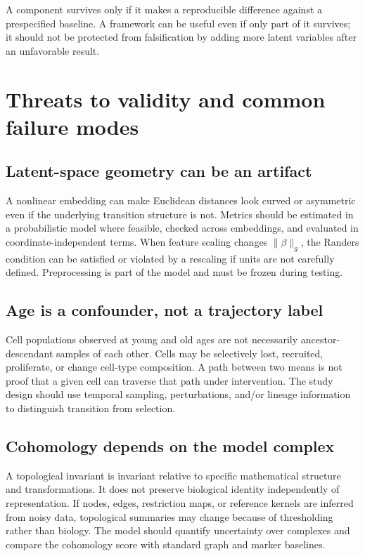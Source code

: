 \documentclass[11pt,a4paper]{article}
\theoremstyle{definition}
\theoremstyle{remark}
\begin{document}
A component survives only if it makes a reproducible difference against a prespecified baseline. A framework can be useful even if only part of it survives; it should not be protected from falsification by adding more latent variables after an unfavorable result.

\section{Threats to validity and common failure modes}
\subsection{Latent-space geometry can be an artifact}
A nonlinear embedding can make Euclidean distances look curved or asymmetric even if the underlying transition structure is not. Metrics should be estimated in a probabilistic model where feasible, checked across embeddings, and evaluated in coordinate-independent terms. When feature scaling changes $\|\beta\|_g$, the Randers condition can be satisfied or violated by a rescaling if units are not carefully defined. Preprocessing is part of the model and must be frozen during testing.

\subsection{Age is a confounder, not a trajectory label}
Cell populations observed at young and old ages are not necessarily ancestor-descendant samples of each other. Cells may be selectively lost, recruited, proliferate, or change cell-type composition. A path between two means is not proof that a given cell can traverse that path under intervention. The study design should use temporal sampling, perturbations, and/or lineage information to distinguish transition from selection.

\subsection{Cohomology depends on the model complex}
A topological invariant is invariant relative to specific mathematical structure and transformations. It does not preserve biological identity independently of representation. If nodes, edges, restriction maps, or reference kernels are inferred from noisy data, topological summaries may change because of thresholding rather than biology. The model should quantify uncertainty over complexes and compare the cohomology score with standard graph and marker baselines.
\end{document}

